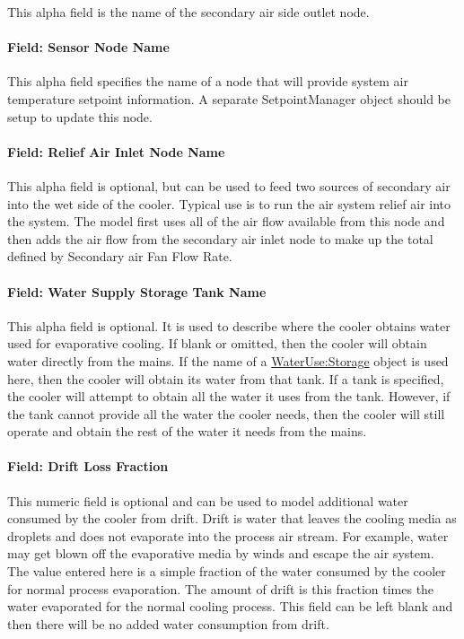 This alpha field is the name of the secondary air side outlet node.

\paragraph{Field: Sensor Node Name}\label{field-sensor-node-name-1}

This alpha field specifies the name of a node that will provide system air temperature setpoint information. A separate SetpointManager object should be setup to update this node.

\paragraph{Field: Relief Air Inlet Node Name}\label{field-relief-air-inlet-node-name}

This alpha field is optional, but can be used to feed two sources of secondary air into the wet side of the cooler. Typical use is to run the air system relief air into the system. The model first uses all of the air flow available from this node and then adds the air flow from the secondary air inlet node to make up the total defined by Secondary air Fan Flow Rate.

\paragraph{Field: Water Supply Storage Tank Name}\label{field-water-supply-storage-tank-name-4}

This alpha field is optional. It is used to describe where the cooler obtains water used for evaporative cooling. If blank or omitted, then the cooler will obtain water directly from the mains. If the name of a \hyperref[waterusestorage]{WaterUse:Storage} object is used here, then the cooler will obtain its water from that tank. If a tank is specified, the cooler will attempt to obtain all the water it uses from the tank. However, if the tank cannot provide all the water the cooler needs, then the cooler will still operate and obtain the rest of the water it needs from the mains.

\paragraph{Field: Drift Loss Fraction}\label{field-drift-loss-fraction-2}

This numeric field is optional and can be used to model additional water consumed by the cooler from drift. Drift is water that leaves the cooling media as droplets and does not evaporate into the process air stream. For example, water may get blown off the evaporative media by winds and escape the air system. The value entered here is a simple fraction of the water consumed by the cooler for normal process evaporation. The amount of drift is this fraction times the water evaporated for the normal cooling process. This field can be left blank and then there will be no added water consumption from drift.

